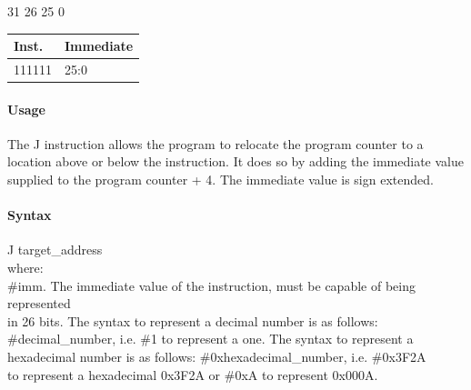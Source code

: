 \documentclass[12pt]{article}
\begin{document}
            \hspace{1.5cm}31 \hspace{1.24cm}26 \hspace{.05cm}25 \hspace{10.2cm}0
            \vspace{-.25cm}
            \begin{center}
                \begin{tabular}{ |p{1.8cm}|p{10.7cm}| }
                    \hline
                    \textbf{Inst.} & \textbf{Immediate}\\
                    \hline
                    111111& 25:0\\
                    \hline
                \end{tabular}
            \end{center}
            
            \noindent
            \paragraph{Usage}
            \begin{flushleft}
            The J instruction allows the program to relocate the program counter to a location above or below the instruction. It does so by adding the immediate value supplied to the program counter + 4. The immediate value is sign extended.
            \end{flushleft}
            
            \paragraph{Syntax}
            \begin{flushleft}
            J target\_address\\ 
            \vspace{1em}        %
            where:\\
            \vspace{1em}
            \#imm.  \hspace{1.8em} The immediate value of the instruction, must be capable of being represented\\             \hspace{5.4em} in 26 bits. The syntax to represent a decimal number is as follows:\\
                    \hspace{5.4em} \#decimal\_number, i.e. \#1 to represent a one. The syntax to represent a\\
                    \hspace{5.4em} hexadecimal number is as follows: \#0xhexadecimal\_number, i.e. \#0x3F2A \\
                    \hspace{5.4em} to represent a hexadecimal 0x3F2A or \#0xA to represent 0x000A.\\
            \end{flushleft}
            
\end{document}
